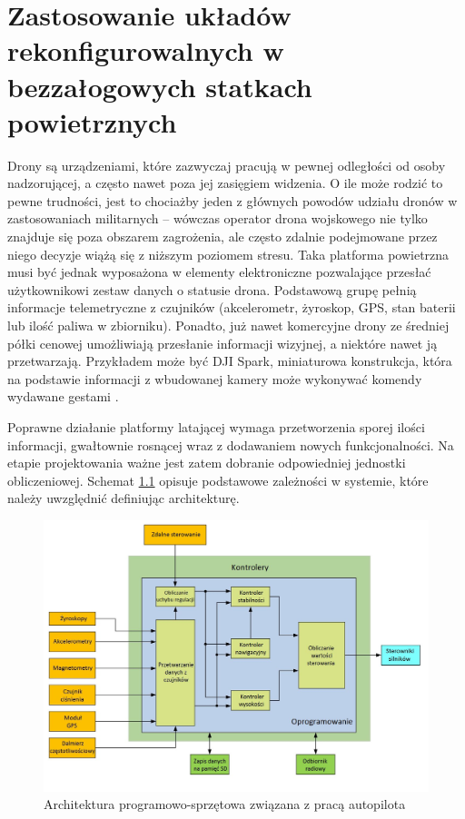 \chapter{Zastosowanie układów rekonfigurowalnych w bezzałogowych statkach powietrznych}

Drony są urządzeniami, które zazwyczaj pracują w pewnej odległości od osoby nadzorującej, a często nawet poza jej zasięgiem widzenia. O ile może rodzić to pewne trudności, jest to chociażby jeden z głównych powodów udziału dronów w zastosowaniach militarnych -- wówczas operator drona wojskowego nie tylko znajduje się poza obszarem zagrożenia, ale często zdalnie podejmowane przez niego decyzje wiążą się z niższym poziomem stresu. Taka platforma powietrzna musi być jednak wyposażona w elementy elektroniczne pozwalające przesłać użytkownikowi zestaw danych o statusie drona. Podstawową grupę pełnią informacje telemetryczne z czujników (akcelerometr, żyroskop, GPS, stan baterii lub ilość paliwa w zbiorniku). Ponadto, już nawet komercyjne drony ze średniej półki cenowej umożliwiają przesłanie informacji wizyjnej, a niektóre nawet ją przetwarzają. Przykładem może być DJI Spark, miniaturowa konstrukcja, która na podstawie informacji z wbudowanej kamery może wykonywać komendy wydawane gestami \cite{SPARK}.

Poprawne działanie platformy latającej wymaga przetworzenia sporej ilości informacji, gwałtownie rosnącej wraz z dodawaniem nowych funkcjonalności. Na etapie projektowania ważne jest zatem dobranie odpowiedniej jednostki obliczeniowej. Schemat \ref{fig:autopilot_architecture} opisuje podstawowe zależności w systemie, które należy uwzględnić definiując architekturę.
\begin{figure}[h]
	\centering
	\includegraphics[width=12cm]{7_drone_platform_overview.jpg}
	\caption{Architektura programowo-sprzętowa związana z pracą autopilota \cite{Bouhali2017} }
	\label{fig:autopilot_architecture}
\end{figure} 

